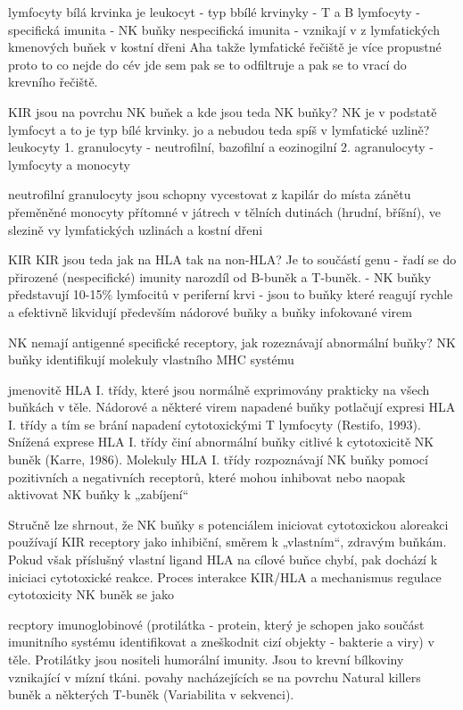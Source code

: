 \documentclass[czech,DP]{thesiskiv}
\begin{document}
lymfocyty 
bílá krvinka je leukocyt
- typ bbílé krvinyky 
- T a B lymfocyty - specifická imunita
- NK buňky nespecifická imunita
- vznikají v z lymfatických kmenových buňek v kostní dřeni
Aha takže lymfatické řečiště je více propustné proto to co nejde do cév jde sem pak se to odfiltruje a pak se to vrací do krevního řečiště.

KIR jsou na povrchu NK buňek a kde jsou teda NK buňky? 
NK je v podstatě lymfocyt a to je typ bílé krvinky. jo a nebudou teda spíš  v lymfatické uzlině? 
leukocyty 1. granulocyty - neutrofilní, bazofilní a eozinogilní
		2. agranulocyty - lymfocyty a monocyty
		
neutrofilní granulocyty jsou schopny vycestovat z kapilár do místa zánětu
přeměněné monocyty přítomné v játrech v tělních dutinách (hrudní, bříšní), ve slezině vy lymfatických uzlinách a kostní dřeni

KIR
KIR jsou teda jak na HLA tak na non-HLA? Je to součástí genu
- řadí se do přirozené (nespecifické) imunity narozdíl od B-buněk a T-buněk.
- NK buňky představují 10-15\% lymfocitů v periferní krvi
- jsou to buňky které reagují rychle a efektivně likvidují především nádorové buňky a buňky infokované virem

NK nemají antigenné specifické receptory, jak rozeznávají abnormální buňky? 
NK buňky identifikují molekuly vlastního MHC systému 

 jmenovitě HLA I. třídy, které jsou normálně exprimovány
prakticky na všech buňkách v těle. Nádorové a některé virem napadené buňky potlačují
expresi HLA I. třídy a tím se brání napadení cytotoxickými T lymfocyty (Restifo, 1993).
Snížená exprese HLA I. třídy činí abnormální buňky citlivé k cytotoxicitě NK buněk (Karre,
1986). Molekuly HLA I. třídy rozpoznávají NK buňky pomocí pozitivních a negativních 
receptorů, které mohou inhibovat nebo naopak aktivovat NK buňky k „zabíjení“

Stručně lze shrnout, že NK buňky s potenciálem iniciovat cytotoxickou aloreakci používají
KIR receptory jako inhibiční, směrem k „vlastním“, zdravým buňkám. Pokud však příslušný
vlastní ligand HLA na cílové buňce chybí, pak dochází k iniciaci cytotoxické reakce. Proces
interakce KIR/HLA a mechanismus regulace cytotoxicity NK buněk se jako 

recptory imunoglobinové (protilátka - protein, který je schopen jako součást imunitního systému identifikovat a zneškodnit cizí objekty - bakterie a viry) v těle. Protilátky jsou nositeli humorální imunity. Jsou to krevní bílkoviny vznikající v mízní tkáni.  povahy nacházejících se na povrchu Natural killers buněk a některých T-buněk (Variabilita v sekvenci).
\end{document}
